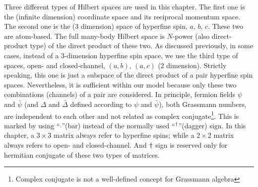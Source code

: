 Three different types of Hilbert spaces are used in this chapter.   The first one is the  (infinite dimension) coordinate space and its reciprocal momentum space.   The second one is the  (3 dimension) space of hyperfine spin, $a,\,b,\,c$.   These two are atom-based.  The full many-body Hilbert space is $N$-power (also direct-product type) of the direct product of these two.  As discussed previously, in some cases, instead of a 3-dimension hyperfine spin space, we use the third type of spaces, open- and closed-channel, $(a,b),\,(a,c)$ (2 dimension).  Strictly speaking, this one is just a subspace of the direct product of a pair hyperfine spin spaces.  Nevertheless,  it is sufficient within our model because only these two combinations (channels) of a pair are considered.    In principle, fermion fields $\psi$ and $\bar\psi$ (and $\Delta$ and $\bar\Delta$ defined according to $\psi$ and $\bar\psi$),  both Grassmann numbers, are independent to each other  and  not related as complex conjugate\footnote{Complex conjugate is not a well-defined concept for Grassmann algebra}.  This is marked by using ``$\bar{\;}$''(bar) instead of the normally used ``$^{\dagger}$''(dagger) sign. In this chapter, a $3\times3$ matrix always refer to hyperfine spins; while a $2\times2$ matrix always refers to  open- and closed-channel.  And $^{}\dagger$ sign  is reserved only for hermitian conjugate of these two types of matrices. 

